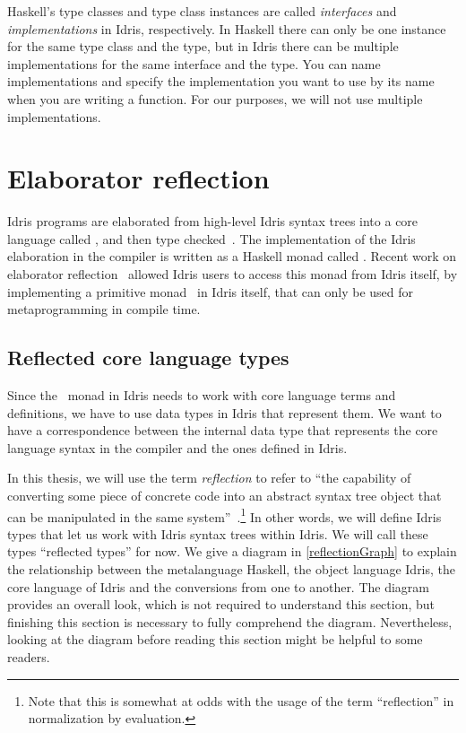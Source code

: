 Haskell's type classes and type class instances are called \emph{interfaces} and
\emph{implementations} in Idris, respectively. In Haskell there can only be one
instance for the same type class and the type, but in Idris there can be
multiple implementations for the same interface and the type. You can name
implementations and specify the implementation you want to use by its name
when you are writing a function. For our purposes, we will not use multiple
implementations.

\section{Elaborator reflection}\label{sec:elabref}

Idris programs are elaborated from high-level Idris syntax trees into a core
language called , and then type checked~\cite{idris}.
The implementation of the Idris elaboration in the compiler is written as a
Haskell monad called .
Recent work on elaborator reflection~\cite{elabref} allowed Idris users to
access this monad from Idris itself, by implementing a primitive monad
\Elab\ in Idris itself, that can only be used for metaprogramming in compile
time.

\subsection{Reflected core language types}\label{ssec:reflectedTypes}

Since the \Elab\ monad in Idris needs to work with core language terms and
definitions, we have to use data types in Idris that represent them.
We want to have a correspondence between the internal data type that represents
the core language syntax in the compiler and the ones defined in Idris.

In this thesis, we will use the term \emph{reflection} to refer to ``the
capability of converting some piece of concrete code into an abstract syntax
tree object that can be manipulated in the same
system''~\cite{reflInAgda}.\footnote{Note that this is somewhat at odds with
the usage of the term ``reflection'' in normalization by evaluation.} In other
words, we will define Idris types that let us work with Idris syntax trees
within Idris.  We will call these types ``reflected types'' for now. We give a
diagram in \autoref{reflectionGraph} to explain the relationship between the
metalanguage Haskell, the object language Idris, the core language of Idris and
the conversions from one to another.  The diagram provides an overall look,
which is not required to understand this section, but finishing this section is
necessary to fully comprehend the diagram. Nevertheless, looking at the diagram
before reading this section might be helpful to some readers.

